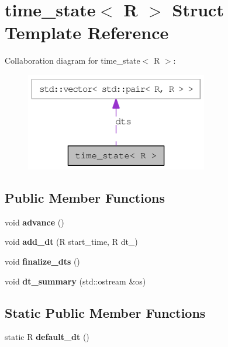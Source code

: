 \hypertarget{structtime__state}{
\section{time\_\-state$<$ R $>$ Struct Template Reference}
\label{structtime__state}
}
Collaboration diagram for time\_\-state$<$ R $>$:\nopagebreak
\begin{figure}[H]
\begin{center}
\leavevmode
\includegraphics[width=226pt]{structtime__state__coll__graph}
\end{center}
\end{figure}
\subsection*{Public Member Functions}
\begin{DoxyCompactItemize}
\item 
\hypertarget{structtime__state_a70140623d9dde0d02302635b0848574a}{
void {\bfseries advance} ()}
\label{structtime__state_a70140623d9dde0d02302635b0848574a}

\item 
\hypertarget{structtime__state_afa54e03a4641e66c4150115137cbef65}{
void {\bfseries add\_\-dt} (R start\_\-time, R dt\_\-)}
\label{structtime__state_afa54e03a4641e66c4150115137cbef65}

\item 
\hypertarget{structtime__state_a96443b1413e21b8a8f0a4bf685d177ac}{
void {\bfseries finalize\_\-dts} ()}
\label{structtime__state_a96443b1413e21b8a8f0a4bf685d177ac}

\item 
\hypertarget{structtime__state_aeed3730c2e20e14d603781aef83f0f7e}{
void {\bfseries dt\_\-summary} (std::ostream \&os)}
\label{structtime__state_aeed3730c2e20e14d603781aef83f0f7e}

\end{DoxyCompactItemize}
\subsection*{Static Public Member Functions}
\begin{DoxyCompactItemize}
\item 
\hypertarget{structtime__state_a4b0e72b80ea35008c7022bcca39402bd}{
static R {\bfseries default\_\-dt} ()}
\label{structtime__state_a4b0e72b80ea35008c7022bcca39402bd}

\end{DoxyCompactItemize}
